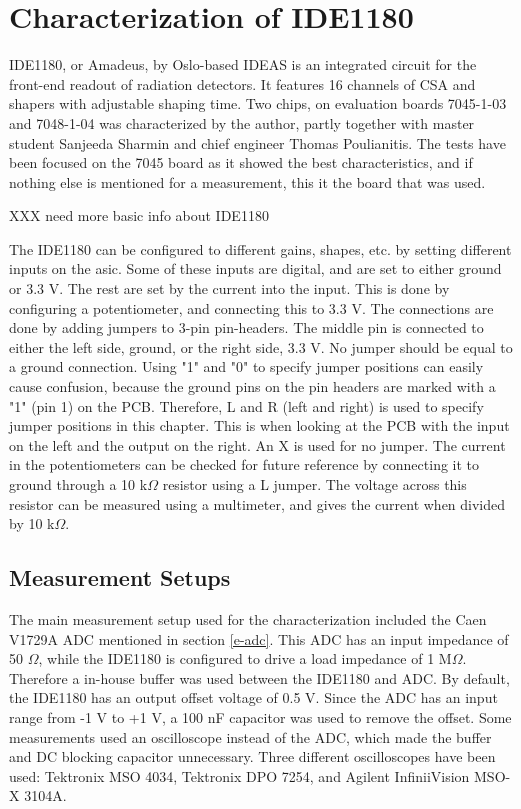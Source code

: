 \documentclass[../main/thesis.tex]{subfiles}
\begin{document}
\newpage

\chapter{Characterization of IDE1180}
\label{ide}

IDE1180, or Amadeus, by Oslo-based IDEAS is an integrated circuit for the front-end readout of radiation detectors. It features 16 channels of \gls{CSA} and shapers with adjustable shaping time. Two chips, on evaluation boards 7045-1-03 and 7048-1-04 was characterized by the author, partly together with master student Sanjeeda Sharmin and chief engineer Thomas Poulianitis. The tests have been focused on the 7045 board as it showed the best characteristics, and if nothing else is mentioned for a measurement, this it the board that was used. 

XXX need more basic info about IDE1180

The IDE1180 can be configured to different gains, shapes, etc. by setting different inputs on the \gls{asic}. Some of these inputs are digital, and are set to either ground or 3.3 V. The rest are set by the current into the input. This is done by configuring a potentiometer, and connecting this to 3.3 V. The connections are done by adding jumpers to 3-pin pin-headers. The middle pin is connected to either the left side, ground, or the right side, 3.3 V. No jumper should be equal to a ground connection. Using "1" and "0" to specify jumper positions can easily cause confusion, because the ground pins on the pin headers are marked with a "1" (pin 1) on the \gls{PCB}. Therefore, L and R (left and right) is used to specify jumper positions in this chapter. This is when looking at the \gls{PCB} with the input on the left and the output on the right. An X is used for no jumper. The current in the potentiometers can be checked for future reference by connecting it to ground through a 10 k$\Omega$ resistor using a L jumper. The voltage across this resistor can be measured using a multimeter, and gives the current when divided by 10 k$\Omega$. 

\section{Measurement Setups}
\label{ide-setup}

The main measurement setup used for the characterization included the Caen V1729A \gls{ADC} mentioned in section \ref{e-adc}. This \gls{ADC} has an input impedance of 50 $\Omega$, while the IDE1180 is configured to drive a load impedance of 1 M$\Omega$. Therefore a in-house buffer was used between the IDE1180 and ADC. By default, the IDE1180 has an output offset voltage of 0.5 V. Since the ADC has an input range from -1 V to +1 V, a 100 nF capacitor was used to remove the offset. Some measurements used an oscilloscope instead of the ADC, which made the buffer and DC blocking capacitor unnecessary. Three different oscilloscopes have been used: Tektronix MSO 4034, Tektronix DPO 7254, and Agilent InfiniiVision MSO-X 3104A. 
\end{document}
